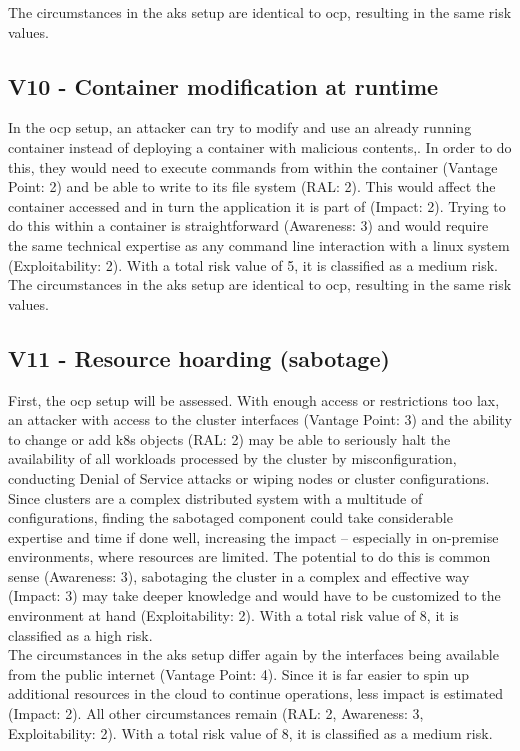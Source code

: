 The circumstances in the \gls{aks} setup are identical to \gls{ocp}, resulting in the same risk values.

\subsection{V10 - Container modification at runtime}

In the \gls{ocp} setup, an attacker can try to modify and use an already running container instead of deploying a container with malicious contents,. In order to do this, they would need to execute commands from within the container (Vantage Point: 2) and be able to write to its file system (RAL: 2). This would affect the container accessed and in turn the application it is part of (Impact: 2).
Trying to do this within a container is straightforward (Awareness: 3) and would require the same technical expertise as any command line interaction with a linux system (Exploitability: 2).
With a total risk value of 5, it is classified as a medium risk. \\


The circumstances in the \gls{aks} setup are identical to \gls{ocp}, resulting in the same risk values.

\subsection{V11 - Resource hoarding (sabotage)}

First, the \gls{ocp} setup will be assessed.
With enough access or restrictions too lax, an attacker with access to the cluster interfaces (Vantage Point: 3) and the ability to change or add \gls{k8s} objects (RAL: 2)  may be able to seriously halt the availability of all workloads processed by the cluster by misconfiguration, conducting Denial of Service attacks or wiping nodes or cluster configurations. Since clusters are a complex distributed system with a multitude of configurations, finding the sabotaged component could take considerable expertise and time if done well, increasing the impact – especially in on-premise environments, where resources are limited.
The potential to do this is common sense (Awareness: 3), sabotaging the cluster in a complex and effective way (Impact: 3) may take deeper knowledge and would have to be customized to the environment at hand (Exploitability: 2).
With a total risk value of 8, it is classified as a high risk. \\


The circumstances in the \gls{aks} setup differ again by the interfaces being available from the public internet (Vantage Point: 4).
Since it is far easier to spin up additional resources in the cloud to continue operations, less impact is estimated (Impact: 2).
All other circumstances remain (RAL: 2, Awareness: 3, Exploitability: 2).
With a total risk value of 8, it is classified as a medium risk.

